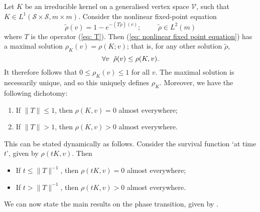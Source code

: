    \begin{lemma}\label{lemma: survival function}
       Let $K$ be an irreducible kernel on a generalised vertex space $\mathcal{V}$, such that $K \in L^1(\mathcal{S}\times \mathcal{S}, m \times m)$. Consider the nonlinear fixed-point equation 
      \begin{equation} \label{eq: nonlinear fixed point equation} 
          \tilde{\rho}(v)=1-e^{-(T\tilde{\rho})(v)}; \hspace{1cm} \tilde{\rho}\in L^2(m)
      \end{equation} where $T$ is the operator (\ref{eq: T}). Then (\ref{eq: nonlinear fixed point equation}) has a maximal solution $\rho_K(v)=\rho(K;v)$; that is, for any other solution $\tilde{\rho}$, \begin{equation}
          \forall v \hspace{0.2cm} \tilde{\rho}(v)\leq \rho(K,v).
      \end{equation} It therefore follows that $0\leq \rho_K(v)\leq 1$ for all $v$. The maximal solution is necessarily unique, and so this uniquely defines $\rho_K.$ Moreover, we have the following dichotomy:
      \begin{enumerate}[label=\roman{*}).]
          \item If $\|T\|\leq 1$, then $\rho(K, v)=0$ almost everywhere;
          \item If $\|T\|> 1$, then $\rho(K, v)>0$ almost everywhere.
      \end{enumerate} This can be stated dynamically as follows. Consider the survival function `at time $t$', given by $\rho(tK,v)$. Then 
      \begin{itemize}
          \item If $t\leq \|T\|^{-1}$, then $\rho(tK, v)=0$ almost everywhere;
          \item If $t>\|T\|^{-1}$, then $\rho(tK, v)>0$ almost everywhere.
      \end{itemize}
      
   \end{lemma} We can now state the main results on the phase transition, given by \cite[Theorem 3.1 and Corollary 3.2]{BJR07}.
